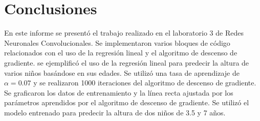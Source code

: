 \documentclass{article}
\begin{document}
    \clearpage


    \section{Conclusiones}
    \noindent
    En este informe se presentó el trabajo realizado en el laboratorio 3 de Redes Neuronales Convolucionales.
    Se implementaron varios bloques de código relacionados con el uso de la regresión lineal y el algoritmo de descenso de gradiente.
    se ejemplificó el uso de la regresión lineal para predecir la altura de varios niños basándose en sus edades.
    Se utilizó una tasa de aprendizaje de $\alpha = 0.07$ y se realizaron 1000 iteraciones del algoritmo de descenso de gradiente.
    Se graficaron los datos de entrenamiento y la línea recta ajustada por los parámetros aprendidos por el algoritmo de descenso de gradiente.
    Se utilizó el modelo entrenado para predecir la altura de dos niños de 3.5 y 7 años.
\end{document}
